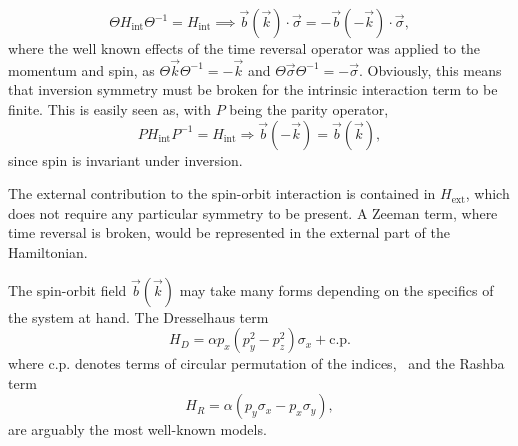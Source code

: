 \begin{equation}
  \Theta H_\text{int} \Theta ^{-1} = H_\text{int}
  \implies 
  \vec{b}(\vec{k}) \cdot \vec{\sigma} = -\vec{b}(-\vec{k}) \cdot \vec{\sigma},
\end{equation}
where the well known effects of the time reversal operator was applied to the momentum and spin, as $\Theta \vec{k} \Theta ^{-1} = -\vec{k}$ and $\Theta \vec{\sigma} \Theta ^{-1} = -\vec{\sigma}$.
Obviously, this means that inversion symmetry must be broken for the intrinsic interaction term  to be finite.
This is easily seen as, with $P$ being the parity operator,
\begin{equation}
  P H_\text{int} P^{-1} = H_\text{int} \Rightarrow
  \vec{b}(-\vec{k}) = \vec{b}(\vec{k}),
\end{equation}
since spin is invariant under inversion.


The external contribution to the spin-orbit interaction is contained in $H_\text{ext}$, which does not require any particular symmetry to be present.
A Zeeman term, where time reversal is broken, would be represented in the external part of the Hamiltonian.


The spin-orbit field $\vec{b}(\vec{k})$ may take many forms depending on the specifics of the system at hand.
The Dresselhaus term
\begin{equation}
  H_D = \alpha p_x (p_y^2 - p_z^2) \sigma_x + \text{c.p.}
\end{equation}
where c.p. denotes terms of circular permutation of the indices,~\cite{manchonNewPerspectivesRashba2015} and the Rashba term~\cite{wuTwoDimensionalGiantTunable2020}
\begin{equation}\label{eq:rashba}
  H_R = \alpha (p_y \sigma_x - p_x \sigma_y),
\end{equation}
are arguably the most well-known models.

